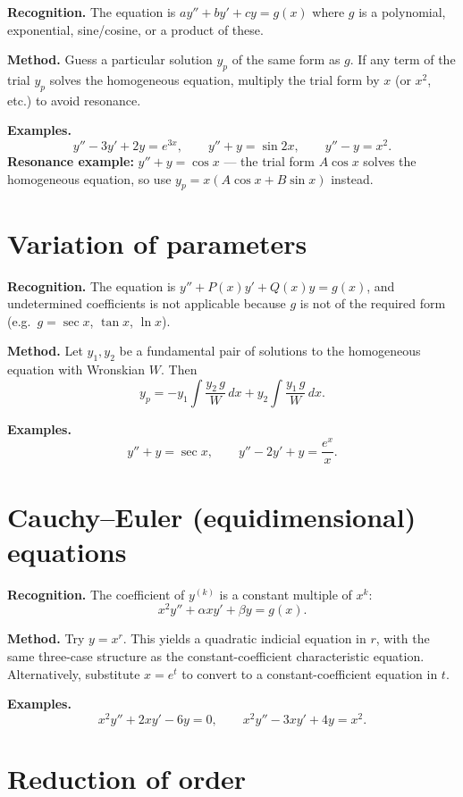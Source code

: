 \documentclass{essay}
\begin{document}
\textbf{Recognition.}  The equation is \(ay'' + by' + cy = g(x)\) where \(g\) is a polynomial, exponential, sine/cosine, or a product of these.

\textbf{Method.}  Guess a particular solution \(y_{p}\) of the same form as \(g\).  If any term of the trial \(y_{p}\) solves the homogeneous equation, multiply the trial form by \(x\) (or \(x^{2}\), etc.) to avoid resonance.

\textbf{Examples.}
\[ y'' - 3y' + 2y = e^{3x}, \qquad y'' + y = \sin 2x, \qquad y'' - y = x^{2}. \]
\textbf{Resonance example:} \(y'' + y = \cos x\) — the trial form \(A\cos x\) solves the homogeneous equation, so use \(y_{p} = x(A\cos x + B\sin x)\) instead.

\section{Variation of parameters}

\textbf{Recognition.}  The equation is \(y'' + P(x)y' + Q(x)y = g(x)\), and undetermined coefficients is not applicable because \(g\) is not of the required form (e.g.\ \(g = \sec x\), \(\tan x\), \(\ln x\)).

\textbf{Method.}  Let \(y_{1}, y_{2}\) be a fundamental pair of solutions to the homogeneous equation with Wronskian \(W\).  Then
\[ y_{p} = -y_{1} \int \frac{y_{2}\, g}{W}\,dx + y_{2} \int \frac{y_{1}\, g}{W}\,dx. \]

\textbf{Examples.}
\[ y'' + y = \sec x, \qquad y'' - 2y' + y = \frac{e^{x}}{x}. \]

\section{Cauchy--Euler (equidimensional) equations}

\textbf{Recognition.}  The coefficient of \(y^{(k)}\) is a constant multiple of \(x^{k}\):
\[ x^{2} y'' + \alpha x y' + \beta y = g(x). \]

\textbf{Method.}  Try \(y = x^{r}\).  This yields a quadratic indicial equation in \(r\), with the same three-case structure as the constant-coefficient characteristic equation.  Alternatively, substitute \(x = e^{t}\) to convert to a constant-coefficient equation in \(t\).

\textbf{Examples.}
\[ x^{2} y'' + 2xy' - 6y = 0, \qquad x^{2} y'' - 3xy' + 4y = x^{2}. \]

\section{Reduction of order}
\end{document}
